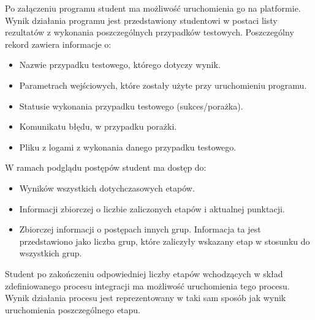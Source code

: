 Po załączeniu programu student ma możliwość uruchomienia go na platformie.
Wynik działania programu jest przedstawiony studentowi w postaci listy rezultatów z wykonania poszczególnych przypadków testowych.
Poszczególny rekord zawiera informacje o:
\begin {itemize}
    \item Nazwie przypadku testowego, którego dotyczy wynik.
    \item Parametrach wejściowych, które zostały użyte przy uruchomieniu programu.
    \item Statusie wykonania przypadku testowego (sukces/porażka).
    \item Komunikatu błędu, w przypadku porażki.
    \item Pliku z logami z wykonania danego przypadku testowego.
\end{itemize}

W ramach podglądu postępów student ma dostęp do:
\begin {itemize}
    \item Wyników wszystkich dotychczasowych etapów.
    \item Informacji zbiorczej o liczbie zaliczonych etapów i aktualnej punktacji.
    \item Zbiorczej informacji o postępach innych grup.
    Informacja ta jest przedstawiono jako liczba grup, które zaliczyły wskazany etap w stosunku do wszystkich grup.
\end {itemize}

Student po zakończeniu odpowiedniej liczby etapów wchodzących w skład zdefiniowanego procesu integracji ma możliwość uruchomienia tego procesu.
Wynik działania procesu jest reprezentowany w taki sam sposób jak wynik uruchomienia poszczególnego etapu.
